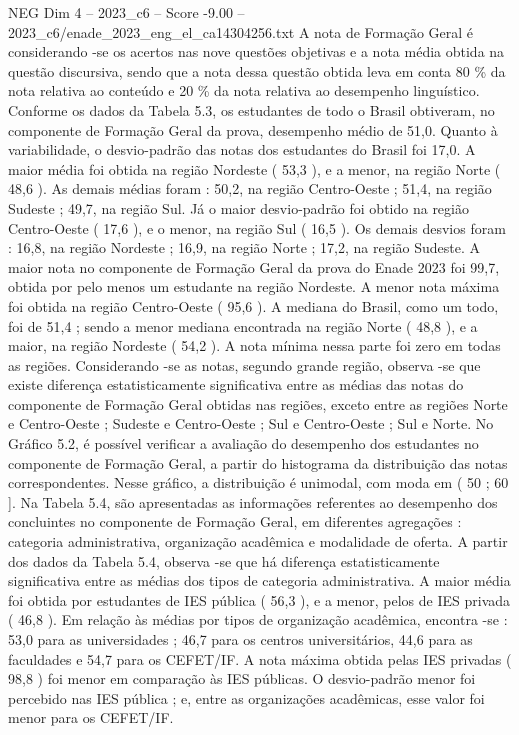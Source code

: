 \begin{textsample}{NEG Dim 4 – 2023\_c6 – Score -9.00 – 2023\_c6/enade\_2023\_eng\_el\_ca14304256.txt}
A nota de Formação Geral é considerando -se os acertos nas nove questões objetivas e a nota média obtida na questão discursiva, sendo que a nota dessa questão obtida leva em conta 80 \% da nota relativa ao conteúdo e 20 \% da nota relativa ao desempenho linguístico.
Conforme os dados da Tabela 5.3, os estudantes de todo o Brasil obtiveram, no componente de Formação Geral da prova, desempenho médio de 51,0.
Quanto à variabilidade, o desvio-padrão das notas dos estudantes do Brasil foi 17,0.
A maior média foi obtida na região Nordeste ( 53,3 ), e a menor, na região Norte ( 48,6 ).
As demais médias foram : 50,2, na região Centro-Oeste ; 51,4, na região Sudeste ; 49,7, na região Sul.
Já o maior desvio-padrão foi obtido na região Centro-Oeste ( 17,6 ), e o menor, na região Sul ( 16,5 ).
Os demais desvios foram : 16,8, na região Nordeste ; 16,9, na região Norte ; 17,2, na região Sudeste.
A maior nota no componente de Formação Geral da prova do Enade 2023 foi 99,7, obtida por pelo menos um estudante na região Nordeste.
A menor nota máxima foi obtida na região Centro-Oeste ( 95,6 ).
A mediana do Brasil, como um todo, foi de 51,4 ; sendo a menor mediana encontrada na região Norte ( 48,8 ), e a maior, na região Nordeste ( 54,2 ).
A nota mínima nessa parte foi zero em todas as regiões.
Considerando -se as notas, segundo grande região, observa -se que existe diferença estatisticamente significativa entre as médias das notas do componente de Formação Geral obtidas nas regiões, exceto entre as regiões Norte e Centro-Oeste ; Sudeste e Centro-Oeste ; Sul e Centro-Oeste ; Sul e Norte.
No Gráfico 5.2, é possível verificar a avaliação do desempenho dos estudantes no componente de Formação Geral, a partir do histograma da distribuição das notas correspondentes.
Nesse gráfico, a distribuição é unimodal, com moda em ( 50 ; 60 ].
Na Tabela 5.4, são apresentadas as informações referentes ao desempenho dos concluintes no componente de Formação Geral, em diferentes agregações : categoria administrativa, organização acadêmica e modalidade de oferta.
A partir dos dados da Tabela 5.4, observa -se que há diferença estatisticamente significativa entre as médias dos tipos de categoria administrativa.
A maior média foi obtida por estudantes de IES pública ( 56,3 ), e a menor, pelos de IES privada ( 46,8 ).
Em relação às médias por tipos de organização acadêmica, encontra -se : 53,0 para as universidades ; 46,7 para os centros universitários, 44,6 para as faculdades e 54,7 para os CEFET/IF.
A nota máxima obtida pelas IES privadas ( 98,8 ) foi menor em comparação às IES públicas.
O desvio-padrão menor foi percebido nas IES pública ; e, entre as organizações acadêmicas, esse valor foi menor para os CEFET/IF.

\end{textsample}
